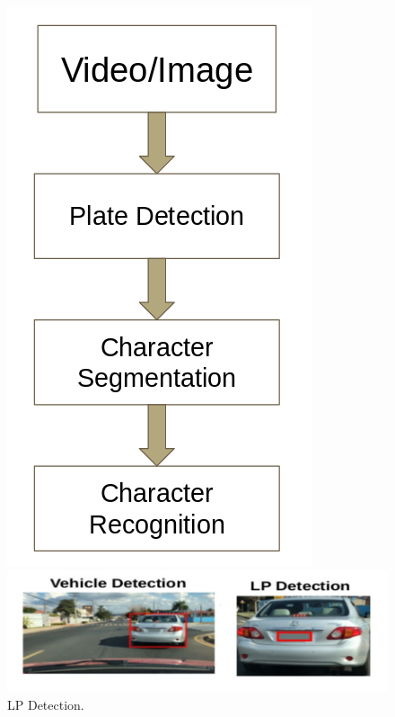 \documentclass[letterpaper,12pt]{article}
\begin{document}
\begin{figure}
	\centering
	\begin{minipage}[b]{.4\textwidth}
		\centering \includegraphics[width=0.8\columnwidth]{ff}
		
		\caption{
			\label{fig:samplesetup} %
			ALPR stages..
		}
		
	\end{minipage}\qquad
	\begin{minipage}[b]{.4\textwidth}
		
		\centering \includegraphics[width=0.8\columnwidth]{lp_detection.png}
		
		\caption{
			\label{fig:2} %
			LP Detection.
		}
		
	\end{minipage}
\end{figure}
\end{document}
